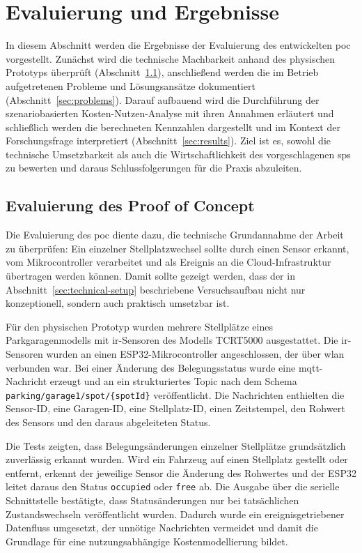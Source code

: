 \section{Evaluierung und Ergebnisse}\label{sec:evaluation}

In diesem Abschnitt werden die Ergebnisse der Evaluierung des entwickelten \ac{poc} vorgestellt. Zunächst wird die technische Machbarkeit anhand des physischen Prototyps überprüft (Abschnitt~\ref{sec:poc}), anschließend werden die im Betrieb aufgetretenen Probleme und Lösungsansätze dokumentiert (Abschnitt~\ref{sec:problems}). Darauf aufbauend wird die Durchführung der szenariobasierten Kosten-Nutzen-Analyse mit ihren Annahmen erläutert und schließlich werden die berechneten Kennzahlen dargestellt und im Kontext der Forschungsfrage interpretiert (Abschnitt~\ref{sec:results}). Ziel ist es, sowohl die technische Umsetzbarkeit als auch die Wirtschaftlichkeit des vorgeschlagenen \ac{sps} zu bewerten und daraus Schlussfolgerungen für die Praxis abzuleiten.

\subsection{Evaluierung des Proof of Concept}\label{sec:poc}

Die Evaluierung des \ac{poc} diente dazu, die technische Grundannahme der Arbeit zu überprüfen: Ein einzelner Stellplatzwechsel sollte durch einen Sensor erkannt, vom Mikrocontroller verarbeitet und als Ereignis an die Cloud-Infrastruktur übertragen werden können. Damit sollte gezeigt werden, dass der in Abschnitt~\ref{sec:technical-setup} beschriebene Versuchsaufbau nicht nur konzeptionell, sondern auch praktisch umsetzbar ist.

Für den physischen Prototyp wurden mehrere Stellplätze eines Parkgaragenmodells mit \ac{ir}-Sensoren des Modells TCRT5000 ausgestattet. Die \ac{ir}-Sensoren wurden an einen ESP32-Mikrocontroller angeschlossen, der über \ac{wlan} verbunden war. Bei einer Änderung des Belegungsstatus wurde eine \ac{mqtt}-Nachricht erzeugt und an ein strukturiertes Topic nach dem Schema \texttt{parking/garage1/spot/\{spotId\}} veröffentlicht. Die Nachrichten enthielten die Sensor-ID, eine Garagen-ID, eine Stellplatz-ID, einen Zeitstempel, den Rohwert des Sensors und den daraus abgeleiteten Status.

Die Tests zeigten, dass Belegungsänderungen einzelner Stellplätze grundsätzlich zuverlässig erkannt wurden. Wird ein Fahrzeug auf einen Stellplatz gestellt oder entfernt, erkennt der jeweilige Sensor die Änderung des Rohwertes und der ESP32 leitet daraus den Status \texttt{occupied} oder \texttt{free} ab. Die Ausgabe über die serielle Schnittstelle bestätigte, dass Statusänderungen nur bei tatsächlichen Zustandswechseln veröffentlicht wurden. Dadurch wurde ein ereignisgetriebener Datenfluss umgesetzt, der unnötige Nachrichten vermeidet und damit die Grundlage für eine nutzungsabhängige Kostenmodellierung bildet.

